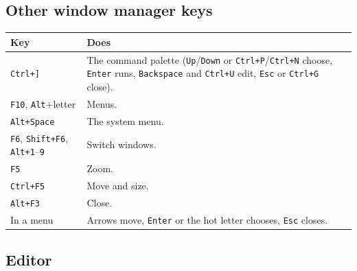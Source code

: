 \documentclass[11pt,a4paper]{article}
\newcommand{\key}[1]{\texttt{#1}}
\begin{document}
\subsection{Other window manager keys}

\begin{longtable}{@{}p{}p{}@{}}
\toprule
\textbf{Key} & \textbf{Does} \\
\midrule
\endhead
\key{Ctrl+]} & The command palette (\key{Up}/\key{Down} or
  \key{Ctrl+P}/\key{Ctrl+N} choose, \key{Enter} runs, \key{Backspace} and
  \key{Ctrl+U} edit, \key{Esc} or \key{Ctrl+G} close). \\
\key{F10}, \key{Alt}+letter & Menus. \\
\key{Alt+Space} & The system menu. \\
\key{F6}, \key{Shift+F6}, \key{Alt+1}--\key{9} & Switch windows. \\
\key{F5} & Zoom. \\
\key{Ctrl+F5} & Move and size. \\
\key{Alt+F3} & Close. \\
In a menu & Arrows move, \key{Enter} or the hot letter chooses, \key{Esc}
  closes. \\
\bottomrule
\end{longtable}

\subsection{Editor}
\end{document}
